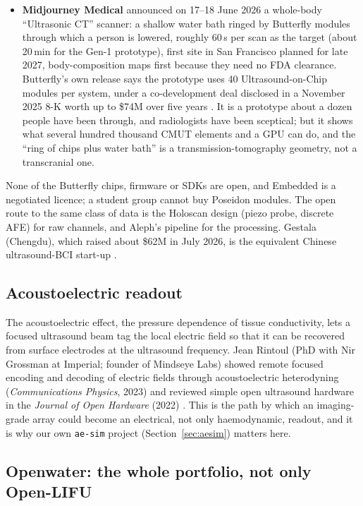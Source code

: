 \documentclass[11pt,a4paper]{article}
\begin{document}
\begin{itemize}[leftmargin=*,nosep]
\item \textbf{Midjourney Medical} announced on 17--18 June 2026 a whole-body ``Ultrasonic CT'' scanner: a shallow water bath ringed by Butterfly modules through which a person is lowered, roughly 60\,s per scan as the target (about 20\,min for the Gen-1 prototype), first site in San Francisco planned for late 2027, body-composition maps first because they need no FDA clearance. Butterfly's own release says the prototype uses 40 Ultrasound-on-Chip modules per system, under a co-development deal disclosed in a November 2025 8-K worth up to \$74M over five years \cite{bfly_midjourney}. It is a prototype about a dozen people have been through, and radiologists have been sceptical; but it shows what several hundred thousand CMUT elements and a GPU can do, and the ``ring of chips plus water bath'' is a transmission-tomography geometry, not a transcranial one.
\end{itemize}

None of the Butterfly chips, firmware or SDKs are open, and Embedded is a negotiated licence; a student group cannot buy Poseidon modules. The open route to the same class of data is the Holoscan design (piezo probe, discrete AFE) for raw channels, and Aleph's pipeline for the processing. Gestala (Chengdu), which raised about \$62M in July 2026, is the equivalent Chinese ultrasound-BCI start-up \cite{gestala}.

\subsection{Acoustoelectric readout}

The acoustoelectric effect, the pressure dependence of tissue conductivity, lets a focused ultrasound beam tag the local electric field so that it can be recovered from surface electrodes at the ultrasound frequency. Jean Rintoul (PhD with Nir Grossman at Imperial; founder of Mindseye Labs) showed remote focused encoding and decoding of electric fields through acoustoelectric heterodyning (\emph{Communications Physics}, 2023) and reviewed simple open ultrasound hardware in the \emph{Journal of Open Hardware} (2022) \cite{rintoul}. This is the path by which an imaging-grade array could become an electrical, not only haemodynamic, readout, and it is why our own \texttt{ae-sim} project (Section~\ref{sec:aesim}) matters here.

\subsection{Openwater: the whole portfolio, not only Open-LIFU}\label{sec:openwater}
\end{document}
